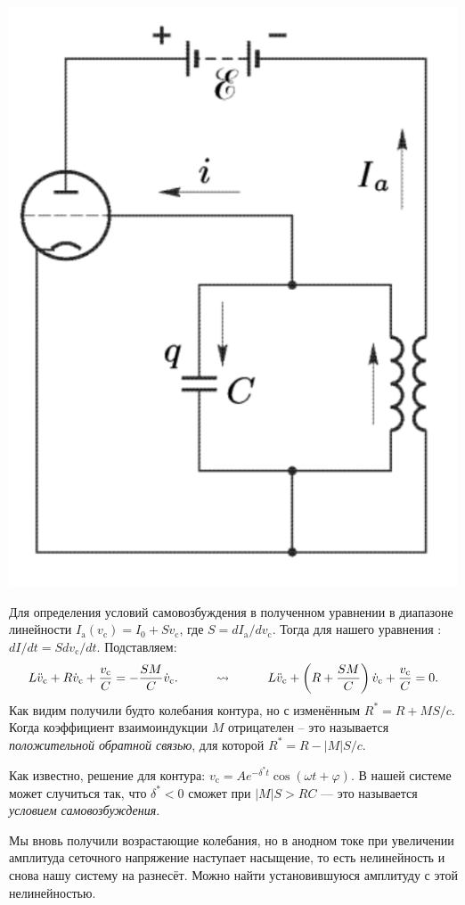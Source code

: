\begin{minipage}{0.25\linewidth}
	\centering
	\includegraphics[width=1\textwidth]{img/lamp.png}
\end{minipage}

Для определения условий самовозбуждения в полученном уравнении в диапазоне линейности $I_{\text{a}}(v_\text{c}) = I_0 + S v_\text{c}$, где $S = d I_\text{a} / d v_\text{c} $. Тогда для нашего уравнения : $d I/ d t = S d v_\text{c}/d t$. Подставляем:
\begin{equation}
	L \ddot{v}_\text{c} +R \dot{v}_\text{c}+ \frac{v_\text{c}}{C} = - \frac{S M}{C} \dot{v}_\text{c}.
	\hspace*{1 cm} \leadsto \hspace*{1 cm} L \ddot{v}_\text{c} +\left(R + \frac{S M}{C}\right)\dot{v}_\text{c}+ \frac{v_\text{c}}{C} = 0.
\end{equation}
Как видим получили будто колебания контура, но с изменённым $R^* = R + M S /c $. Когда коэффициент взаимоиндукции $M$ отрицателен -- это называется \textit{положительной обратной связью}, для которой $R^* = R - |M| S /c $. 

Как известно, решение для контура: $v_\text{c} = A e^{-\delta^* t} \cos (\omega t + \varphi) $.
В нашей системе может случиться так, что $\delta^* < 0$ сможет при $|M| S > R C$ --- это называется \textit{условием самовозбуждения}.

Мы вновь получили возрастающие колебания, но в анодном токе при увеличении амплитуда сеточного напряжение наступает насыщение, то есть нелинейность и снова нашу систему на разнесёт. Можно найти установившуюся амплитуду с этой нелинейностью.